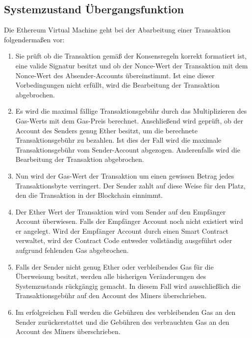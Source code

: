 \subsection{Systemzustand Übergangsfunktion}
Die Ethereum Virtual Machine geht bei der Abarbeitung einer Transaktion folgendermaßen vor:
\begin{enumerate}
\item Sie prüft ob die Transaktion gemäß der Konsensregeln korrekt formatiert ist, eine valide Signatur besitzt und ob der Nonce-Wert der Transaktion mit dem Nonce-Wert des Absender-Accounts übereinstimmt. Ist eine dieser Vorbedingungen nicht erfüllt, wird die Bearbeitung der Transaktion abgebrochen. 
\item Es wird die maximal fällige Transaktionsgebühr durch das Multiplizieren des Gas-Werts mit dem Gas-Preis berechnet. Anschließend wird geprüft, ob der Account des Senders genug Ether besitzt, um die berechnete Transaktionsgebühr zu bezahlen. Ist dies der Fall wird die maximale Transaktionsgebühr vom Sender-Account abgezogen. Anderenfalls wird die Bearbeitung der Transaktion abgebrochen. 
\item Nun wird der Gas-Wert der Transaktion um einen gewissen Betrag jedes Transaktionsbyte verringert. Der Sender zahlt auf diese Weise für den Platz, den die Transaktion in der Blockchain einnimmt.
\item Der Ether Wert der Transaktion wird vom Sender auf den Empfänger Account überwiesen. Falls der Empfänger Account noch nicht existiert wird er angelegt. Wird der Empfänger Account durch einen Smart Contract verwaltet, wird der Contract Code entweder vollständig ausgeführt oder aufgrund fehlenden Gas abgebrochen. 
\item Falls der Sender nicht genug Ether oder verbleibendes Gas für die Überweisung besitzt, werden alle bisherigen Veränderungen des Systemzustands rückgängig gemacht. In diesem Fall wird ausschließlich die Transaktionsgebühr  auf den Account des Miners überschrieben.
\item Im erfolgreichen Fall werden die Gebühren des verbleibenden Gas an den Sender zurückerstattet und die Gebühren des verbrauchten Gas an den Account des Miners überschrieben.
\end{enumerate}

